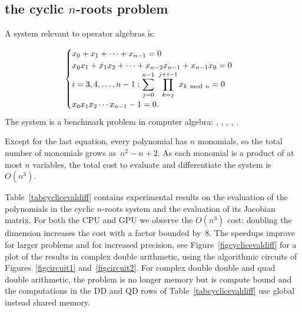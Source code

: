 \documentclass{article}
\begin{document}
\newpage
\subsection{the cyclic $n$-roots problem}

A system relevant to operator algebras is:

\begin{equation} \label{eqcyclicsys}
   \begin{cases}
   x_{0}+x_{1}+ \cdots +x_{n-1}=0 \\
   x_{0}x_{1}+x_{1}x_{2}+ \dots +x_{n-2}x_{n-1}+x_{n-1}x_{0}=0 \\
   i = 3, 4, \ldots, n-1: 
    \displaystyle\sum_{j=0}^{n-1} ~ \prod_{k=j}^{j+i-1}
    x_{k~{\rm mod}~n}=0 \\
   x_{0}x_{1}x_{2} \cdots x_{n-1} - 1 = 0. \\
\end{cases}
\end{equation}
The system is a benchmark problem in computer algebra:
\cite{AV13}, \cite{BF94}, \cite{DKK03}, \cite{Fau01}, \cite{Sab11}.

Except for the last equation, every polynomial has $n$ monomials,
so the total number of monomials grows as~$n^2 - n + 2$.
As each monomial is a product of at most $n$ variables,
the total cost to evaluate and differentiate the system is~$O(n^3)$.

Table~\ref{tabcyclicevaldiff}
contains experimental results on the
evaluation of the polynomials in the cyclic $n$-roots system and
the evaluation of its Jacobian matrix.
For both the CPU and GPU we observe the $O(n^3)$ cost:
doubling the dimension increases the cost with a factor bounded by~8.
The speedups improve for larger problems and for increased precision,
see Figure~\ref{figcyclicevaldiff} for a plot of the results
in complex double arithmetic, using the algorithmic circuits
of Figures~\ref{figcircuit1} and~\ref{figcircuit2}.
For complex double double and quad double arithmetic,
the problem is no longer memory but is compute bound
and the computations in the DD and QD rows of 
Table~\ref{tabcyclicevaldiff} use global instead shared memory.
\end{document}
